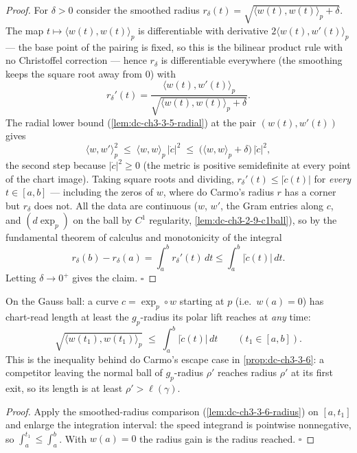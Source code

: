 \begin{proof}
  \leanok
  For $\delta>0$ consider the smoothed radius
  $r_\delta(t)=\sqrt{\langle w(t),w(t)\rangle_p+\delta}$. The map
  $t\mapsto\langle w(t),w(t)\rangle_p$ is differentiable with derivative
  $2\langle w(t),w'(t)\rangle_p$ — the base point of the pairing is fixed, so
  this is the bilinear product rule with no Christoffel correction — hence
  $r_\delta$ is differentiable everywhere (the smoothing keeps the square root
  away from $0$) with
  $$r_\delta'(t)=\frac{\langle w(t),w'(t)\rangle_p}
    {\sqrt{\langle w(t),w(t)\rangle_p+\delta}}.$$
  The radial lower bound (\cref{lem:dc-ch3-3-5-radial}) at the pair
  $(w(t),w'(t))$ gives
  $$\langle w,w'\rangle_p^2\;\le\;\langle w,w\rangle_p\,\big|\dot c\big|^2
    \;\le\;\big(\langle w,w\rangle_p+\delta\big)\,\big|\dot c\big|^2,$$
  the second step because $|\dot c|^2\ge 0$ (the metric is positive
  semidefinite at every point of the chart image). Taking square roots and
  dividing, $r_\delta'(t)\le|\dot c(t)|$ for \emph{every} $t\in[a,b]$ —
  including the zeros of $w$, where do Carmo's radius $r$ has a corner but
  $r_\delta$ does not. All the data are continuous ($w$, $w'$, the Gram
  entries along $c$, and $(d\exp_p)$ on the ball by $C^1$ regularity,
  \cref{lem:dc-ch3-2-9-c1ball}), so by the fundamental theorem of calculus
  and monotonicity of the integral
  $$r_\delta(b)-r_\delta(a)=\int_a^b r_\delta'(t)\,dt
    \le\int_a^b\big|\dot c(t)\big|\,dt.$$
  Letting $\delta\to0^+$ gives the claim. $\square$
\end{proof}

\begin{lemma}
  \label{lem:dc-ch3-3-6-reach}
  \leanok
  On the Gauss ball: a curve $c=\exp_p\circ w$ starting at $p$ (i.e.\
  $w(a)=0$) has chart-read length at least the $g_p$-radius its polar lift
  reaches at \emph{any} time:
  $$\sqrt{\langle w(t_1),w(t_1)\rangle_p}\;\le\;\int_a^b|\dot c(t)|\,dt
    \qquad(t_1\in[a,b]).$$
  This is the inequality behind do Carmo's escape case in
  \cref{prop:dc-ch3-3-6}: a competitor leaving the normal ball of
  $g_p$-radius $\rho'$ reaches radius $\rho'$ at its first exit, so its
  length is at least $\rho'>\ell(\gamma)$.
\end{lemma}
\begin{proof}
  \leanok
  Apply the smoothed-radius comparison (\cref{lem:dc-ch3-3-6-radius}) on
  $[a,t_1]$ and enlarge the integration interval: the speed integrand is
  pointwise nonnegative, so $\int_a^{t_1}\le\int_a^b$. With $w(a)=0$ the
  radius gain is the radius reached. $\square$
\end{proof}

